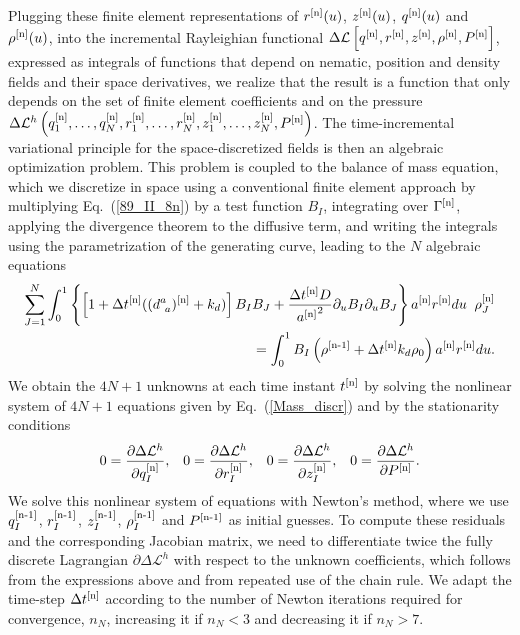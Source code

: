 {Plugging these finite element representations of $r^{[\textup{n}]}(u)$, $z^{[\textup{n}]}(u)$, $q^{[\textup{n}]}(u)$ and  $\rho^{[\textup{n}]}(u)$, into the incremental Rayleighian functional $\Delta \mathcal{L}\left[q^{[\textup{n}]}, r^{[\textup{n}]}, z^{[\textup{n}]}, \rho^{[\textup{n}]}, P^{[\textup{n}]}\right]$, expressed as integrals of functions that depend on nematic, position and density fields and their space derivatives, we realize that the result is a function that only depends on the set of finite element coefficients and on the pressure $\Delta \mathcal{L}^h\left(q_1^{[\textup{n}]}, \ldots,  q_N^{[\textup{n}]}, r_1^{[\textup{n}]}, \ldots,  r_N^{[\textup{n}]}, z_1^{[\textup{n}]}, \ldots,  z_N^{[\textup{n}]}, P^{[\textup{n}]} \right)$. The time-incremental variational principle for the space-discretized fields is then an algebraic optimization problem. This problem is coupled to the balance of mass equation, which we discretize in space using a conventional finite element approach by multiplying Eq.~(\ref{89_II_8n}) by a test function $B_I$, integrating over $\Gamma^{[\textup{n}]}$, applying the divergence theorem to the diffusive term, and writing the integrals using the parametrization of the generating curve, leading to the $N$ algebraic equations
\begin{align}  \label{Mass_discr}
\sum_{J=1}^N \int_0^1 \left\{\left[1+\Delta t^{[\textup{n}]}((d_{~ a}^a)^{[\textup{n}]} + k_d ) \right] B_I B_J +  \frac{\Delta t^{[\textup{n}]} D}{{a^{[\textup{n}]}}^2} \partial_u B_I \partial_u B_J  \right\}  a^{[\textup{n}]} r^{[\textup{n}]} du  \; \; \rho^{[\textup{n}]}_J \\  = \int_0^1 B_I\left(\rho^{[\textup{n-1}]}  + \Delta t^{[\textup{n}]} k_d \rho_0\right) a^{[\textup{n}]} r^{[\textup{n}]} du.\nonumber
\end{align}
We obtain the $4N+1$ unknowns at each time instant $t^{[\textup{n}]}$ by solving the nonlinear system of $4N+1$ equations given by Eq.~(\ref{Mass_discr})  and by the stationarity conditions
\begin{equation}  
0 = \frac{\partial \Delta \mathcal{L}^h}{\partial q_I^{[\textup{n}]}}, \; \; \; 0 = \frac{\partial \Delta \mathcal{L}^h}{\partial r_I^{[\textup{n}]}}, \; \; \; 0 = \frac{\partial \Delta \mathcal{L}^h}{\partial z_I^{[\textup{n}]}}, \; \; \; 0 = \frac{\partial \Delta \mathcal{L}^h}{\partial P^{[\textup{n}]}}.
\end{equation}
We solve this nonlinear system of equations with Newton's method, where we use $q_I^{[\textup{n-1}]}$, $r_I^{[\textup{n-1}]}$, $z_I^{[\textup{n-1}]}$, $\rho_I^{[\textup{n-1}]}$ and $P^{[\textup{n-1}]}$ as initial guesses. To compute these residuals and the corresponding Jacobian matrix, we need to differentiate twice the fully discrete Lagrangian $\partial \Delta \mathcal{L}^h$ with respect to the unknown coefficients, which follows from the expressions above and from repeated use of the chain rule. We adapt the time-step $\Delta t^{[\textup{n}]}$ according to the number of Newton iterations required for convergence, $n_{N}$, increasing it if $n_{N}< 3$ and decreasing it if  $n_{N}> 7$.

}
